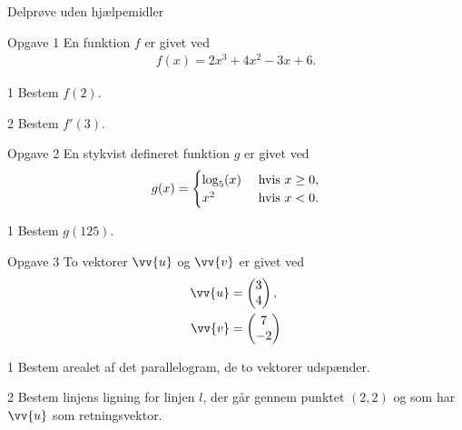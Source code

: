 \documentclass[12pt,x11names,a4paper]{article}
\begin{document}
\newpage

\begin{center}
\LARGE
Delprøve uden hjælpemidler 
\end{center}

%
%
%
%
\begin{opgavetekst}{Opgave 1}
	En funktion $f$ er givet ved
	\begin{align*}
		f(x) = 2x^3+4x^2-3x+6.
	\end{align*}
\end{opgavetekst}
\begin{delopgave}{}{1}
	Bestem $f(2)$.
\end{delopgave}
\begin{delopgave}{}{2}
	Bestem $f'(3)$.
\end{delopgave}
%
%
%
%
\begin{opgavetekst}{Opgave 2}
	En stykvist defineret funktion $g$ er givet ved
	\begin{align*}
		g(x) = \begin{cases}
			\log_5(x) \ &\textnormal{hvis }x \geq 0, \\
			x^2 \ &\textnormal{hvis }x < 0.		
		\end{cases}
	\end{align*}
\end{opgavetekst}
\begin{delopgave}{}{1}
	Bestem $g(125)$.
\end{delopgave}
%
%
%
%
\begin{opgavetekst}{Opgave 3}
	To vektorer $\vv{u}$ og $\vv{v}$ er givet ved
	\begin{align*}
		\vv{u} &= 
		\begin{pmatrix}
			3 \\ 4
		\end{pmatrix}, \\
		\vv{v} &= 
		\begin{pmatrix}
			7 \\ -2
		\end{pmatrix}
	\end{align*}
\end{opgavetekst}
\begin{delopgave}{}{1}
	Bestem arealet af det parallelogram, de to vektorer udspænder. 
\end{delopgave}
\begin{delopgave}{}{2}
	Bestem linjens ligning for linjen $l$, der går gennem punktet $(2,2)$ og som har $\vv{u}$ som 
	retningsvektor.
\end{delopgave}
\end{document}
